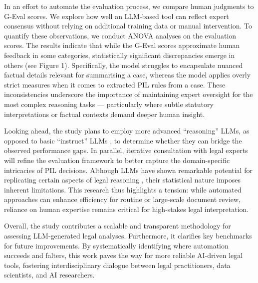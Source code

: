 \documentclass[a4paper,12pt]{article}
\begin{document}
In an effort to automate the evaluation process, we compare human judgments to G-Eval scores. We explore how well an LLM-based tool can reflect expert consensus without relying on additional training data or manual intervention. To quantify these observations, we conduct ANOVA analyses on the evaluation scores. The results indicate that while the G-Eval scores approximate human feedback in some categories, statistically significant discrepancies emerge in others (see Figure 1). Specifically, the model struggles to encapsulate nuanced factual details relevant for summarising a case, whereas the model applies overly strict measures when it comes to extracted PIL rules from a case. These inconsistencies underscore the importance of maintaining expert oversight for the most complex reasoning tasks — particularly where subtle statutory interpretations or factual contexts demand deeper human insight.

Looking ahead, the study plans to employ more advanced ``reasoning” LLMs, as opposed to basic ``instruct” LLMs \parencite[p.~22]{alammar_hands_large_2024}, to determine whether they can bridge the observed performance gaps. In parallel, iterative consultation with legal experts will refine the evaluation framework to better capture the domain-specific intricacies of PIL decisions. Although LLMs have shown remarkable potential for replicating certain aspects of legal reasoning \parencite{anon_2025, spaic_2024_14222584}, their statistical nature imposes inherent limitations. This research thus highlights a tension: while automated approaches can enhance efficiency for routine or large-scale document review, reliance on human expertise remains critical for high-stakes legal interpretation.

Overall, the study contributes a scalable and transparent methodology for assessing LLM-generated legal analyses. Furthermore, it clarifies key benchmarks for future improvements. By systematically identifying where automation succeeds and falters, this work paves the way for more reliable AI-driven legal tools, fostering interdisciplinary dialogue between legal practitioners, data scientists, and AI researchers.

\end{document}
